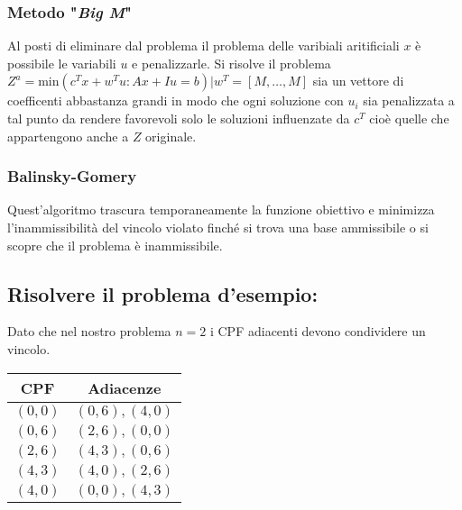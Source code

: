 \documentclass{article}
\begin{document}
\subsubsection{Metodo "\textit{Big M}"}
Al posti di eliminare dal problema il problema delle varibiali aritificiali $x$ è possibile le variabili $u$ e penalizzarle. Si risolve il problema $Z^a=\text{min}(c^Tx+w^Tu:Ax+Iu=b)|w^T=[M,\dots,M]$ sia un vettore di coefficenti abbastanza grandi in modo che ogni soluzione con $u_i$ sia penalizzata a tal punto da rendere favorevoli solo le soluzioni influenzate da $c^T$ cioè quelle che appartengono anche a $Z$ originale.

\subsubsection{Balinsky-Gomery}
Quest'algoritmo trascura temporaneamente la funzione obiettivo e minimizza l'inammissibilità del vincolo violato finché si trova una base ammissibile o si scopre che il problema è inammissibile.

\subsection{Risolvere il problema d'esempio:}
\begin{minipage}{0.55\textwidth}
  Dato che nel nostro problema $n=2$ i CPF adiacenti devono condividere un vincolo.
\end{minipage}
\hfill
\begin{minipage}{0.30\textwidth}
  \begin{tabular}{|c|c|}
    \hline
    \textbf{CPF} & \textbf{Adiacenze} \\
    \hline
    $(0,0)$      & $(0,6),(4,0)$      \\
    $(0,6)$      & $(2,6),(0,0)$      \\
    $(2,6)$      & $(4,3),(0,6)$      \\
    $(4,3)$      & $(4,0),(2,6)$      \\
    $(4,0)$      & $(0,0),(4,3)$      \\
    \hline
  \end{tabular}
\end{minipage}
\end{document}
